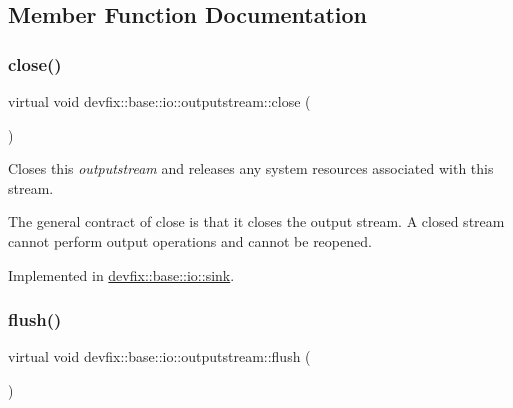 \subsection{Member Function Documentation}
\mbox{\label{structdevfix_1_1base_1_1io_1_1outputstream_a060c2e7040e6bb831b8150f64bd8abf7}} 
\subsubsection{\texorpdfstring{close()}{close()}}
{\footnotesize\ttfamily virtual void devfix\+::base\+::io\+::outputstream\+::close (\begin{DoxyParamCaption}{ }\end{DoxyParamCaption})\hspace{0.3cm}{\ttfamily [pure virtual]}}



Closes this {\itshape outputstream} and releases any system resources associated with this stream. 

The general contract of close is that it closes the output stream. A closed stream cannot perform output operations and cannot be reopened. 

Implemented in \hyperlink{structdevfix_1_1base_1_1io_1_1sink_a2d110d27baa88f462540e7fd59fb8b3c}{devfix\+::base\+::io\+::sink}.

\mbox{\label{structdevfix_1_1base_1_1io_1_1outputstream_a3fe3b34675a2d70331e6ca235388e0cc}} 
\subsubsection{\texorpdfstring{flush()}{flush()}}
{\footnotesize\ttfamily virtual void devfix\+::base\+::io\+::outputstream\+::flush (\begin{DoxyParamCaption}{ }\end{DoxyParamCaption})\hspace{0.3cm}{\ttfamily [pure virtual]}}



